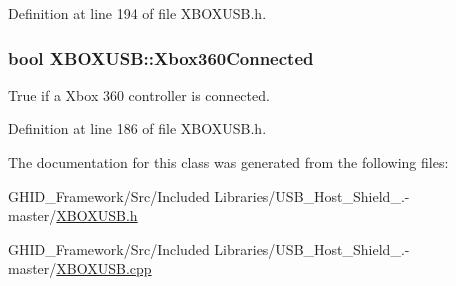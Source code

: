 \-Definition at line 194 of file \-X\-B\-O\-X\-U\-S\-B.\-h.

\hypertarget{class_x_b_o_x_u_s_b_a1c779ae5483a2f73426650242a37d868}{
\subsubsection[{\-Xbox360\-Connected}]{\setlength{\rightskip}{0pt plus 5cm}bool {\bf \-X\-B\-O\-X\-U\-S\-B\-::\-Xbox360\-Connected}}}\label{class_x_b_o_x_u_s_b_a1c779ae5483a2f73426650242a37d868}
\-True if a \-Xbox 360 controller is connected. 

\-Definition at line 186 of file \-X\-B\-O\-X\-U\-S\-B.\-h.



\-The documentation for this class was generated from the following files\-:\begin{DoxyCompactItemize}
\item 
\-G\-H\-I\-D\-\_\-\-Framework/\-Src/\-Included Libraries/\-U\-S\-B\-\_\-\-Host\-\_\-\-Shield\-\_.-\/master/\hyperlink{_x_b_o_x_u_s_b_8h}{\-X\-B\-O\-X\-U\-S\-B.\-h}\item 
\-G\-H\-I\-D\-\_\-\-Framework/\-Src/\-Included Libraries/\-U\-S\-B\-\_\-\-Host\-\_\-\-Shield\-\_.-\/master/\hyperlink{_x_b_o_x_u_s_b_8cpp}{\-X\-B\-O\-X\-U\-S\-B.\-cpp}\end{DoxyCompactItemize}
